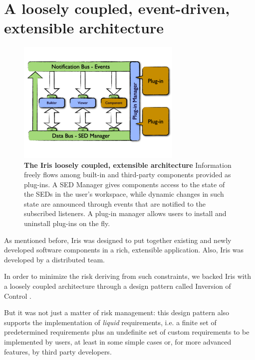 \documentclass[5p]{elsarticle}
\begin{document}
\section{A loosely coupled, event-driven, extensible architecture}
\label{sec:architecture}

\begin{figure}
\label{fig:architecture}
\begin{center}
\includegraphics[width=0.7\textwidth]{figures/IrisDiagrams.1.png}
\caption{\textbf{The Iris loosely coupled, extensible architecture} Information freely flows among built-in and third-party components provided as plug-ins. A SED Manager gives components access to the state of the SEDs in the user's workspace, while dynamic changes in such state are announced through events that are notified to the subscribed listeners. A plug-in manager allows users to install and uninstall plug-ins on the fly.}
\end{center}
\end{figure}

As mentioned before, Iris was designed to put together existing and newly developed software components in a rich, extensible application. Also, Iris was developed by a distributed team.

In order to minimize the risk deriving from such constraints, we backed Iris with a loosely coupled architecture through a design pattern called Inversion of Control \citep*{ioc}.

But it was not just a matter of risk management: this design pattern also supports the implementation of \emph{liquid} requirements, i.e. a finite set of predetermined requirements plus an undefinite set of custom requirements to be implemented by users, at least in some simple cases or, for more advanced features, by third party developers.
\end{document}
